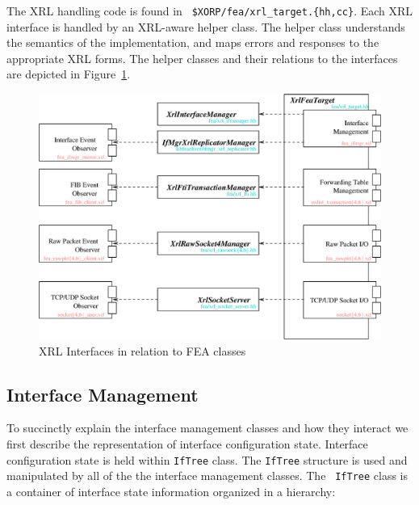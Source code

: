 \documentclass[11pt]{article}
\begin{document}
The XRL handling code is found in {\tt
\$XORP/fea/xrl\_target.\{hh,cc\}}.  Each XRL interface is handled by
an XRL-aware helper class.  The helper class understands the semantics
of the implementation, and maps errors and responses to the appropriate
XRL forms.  The helper classes and their relations to the interfaces
are depicted in Figure~\ref{fig:xrl_ifs}.

\clearpage
\begin{figure}[htbp]
  \begin{center}
    \includegraphics[angle=90,height=0.90\textheight]{figs/xrl_ifs}
    \caption{XRL Interfaces in relation to FEA classes}
    \label{fig:xrl_ifs}
  \end{center}
\end{figure}
\clearpage


\subsection{Interface Management}

To succinctly explain the interface management classes and how they
interact we first describe the representation of interface
configuration state.  Interface configuration state is held within
{\tt IfTree} class.  The {\tt IfTree} structure is used and
manipulated by all of the the interface management classes.  The {\tt
IfTree} class is a container of interface state information organized
in a hierarchy:
\end{document}
